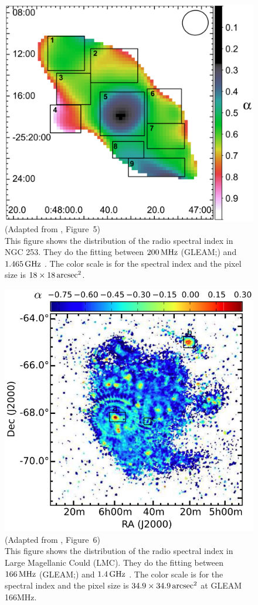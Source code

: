 \begin{figure}[htbp]
	\centering
	\includegraphics[width=.6\linewidth]{Chapter_1/Figures/Kapinska2017_Figure5.png}
    \caption[Adaptedfrom \citet{Kapinska2017a} (Figure~5)]{\label{fig:Kapinska2017_Figure5}
        (Adapted from \citet{Kapinska2017a}, Figure~5)\\
        This figure shows the distribution of the radio spectral index in NGC 253.
        They do the fitting between $200\,\mathrm{MHz}$ (GLEAM;\@\citealt{Hurley-Walker2017a}) and $1.465\,\mathrm{GHz}$ \citep{Carilli1992}.
        The color scale is for the spectral index and the pixel size is $18 \times 18 \,\mathrm{arcsec}^2$.
    }
\end{figure}

\begin{figure}[htbp]
	\centering
	\includegraphics[width=.6\linewidth]{Chapter_1/Figures/For2018_Figure6.png}
    \caption[Adapted from \citet{For2018a} (Figure~6)]{\label{fig:For2018_Figure6}
        (Adapted from \citet{For2018a}, Figure~6)\\
        This figure shows the distribution of the radio spectral index in Large Magellanic Could (LMC).
        They do the fitting between $166\,\mathrm{MHz}$ (GLEAM;\@\citealt{Hurley-Walker2017a}) and $1.4\,\mathrm{GHz}$ \citep{Hughes2007}.
        The color scale is for the spectral index and the pixel size is $34.9 \times 34.9 \,\mathrm{arcsec}^2$ at GLEAM 166MHz.
    }
\end{figure}

